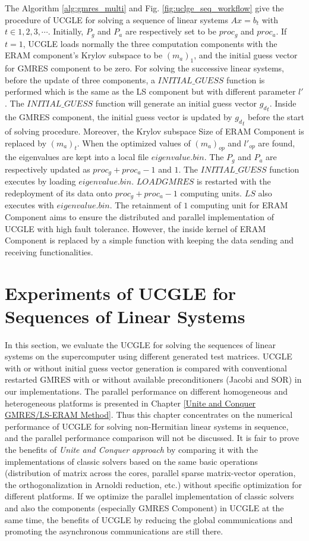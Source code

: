 The Algorithm \ref{alg:gmres_multi} and Fig. \ref{fig:uclge_seq_workflow} give the procedure of UCGLE for solving  a sequence of linear systems $Ax= b_t$ with $t \in 1,2,3, \cdots$. Initially, $P_g$ and $P_a$ are respectively set to be $proc_g$ and $proc_a$.  If $t=1$, UCGLE loads normally the three computation components with the ERAM component's Krylov subspace to be $(m_a)_1$, and the initial guess vector for GMRES component to be zero. For solving the successive linear systems, before the update of three components, a $INITIAL\_GUESS$ function is performed which is the same as the LS component but with different parameter $l'$. The $INITIAL\_GUESS$ function will generate an initial guess vector ${g_d}_t$. Inside the GMRES component, the initial guess vector is updated by ${g_d}_t$ before the start of solving procedure. Moreover, the Krylov subspace Size of ERAM Component is replaced by $(m_a)_t$. When the optimized values of $(m_a)_{op}$ and $l'_{op}$ are found, the eigenvalues are kept into a local file $eigenvalue.bin$. The $P_g$ and $P_a$ are respectively updated as  $proc_g+proc_a-1$ and $1$. The $INITIAL\_GUESS$ function executes by loading $eigenvalue.bin$. $LOADGMRES$ is restarted with the redeployment of its data onto $proc_g+proc_a-1$ computing units. $LS$ also executes with $eigenvalue.bin$. The retainment of $1$ computing unit for ERAM Component aims to ensure the distributed and parallel implementation of UCGLE with high fault tolerance. However, the inside kernel of ERAM Component is replaced by a simple function with keeping the data sending and receiving functionalities.

\section{Experiments of UCGLE for Sequences of Linear Systems}

In this section, we evaluate the UCGLE for solving the sequences of linear systems on the supercomputer using different generated test matrices. UCGLE with or without initial guess vector generation is compared with conventional restarted GMRES with or without available preconditioners (Jacobi and SOR) in our implementations. The parallel performance on different homogeneous and heterogeneous platforms is presented in Chapter \ref{Unite and Conquer GMRES/LS-ERAM Method}. Thus this chapter concentrates on the numerical performance of UCGLE for solving non-Hermitian linear systems in sequence, and the parallel performance comparison will not be discussed. It is fair to prove the benefits of \textit{Unite and Conquer approach} by comparing it with the implementations of classic solvers based on the same basic operations (distribution of matrix across the cores, parallel sparse matrix-vector operation, the orthogonalization in Arnoldi reduction, etc.) without specific optimization for different platforms. If we optimize the parallel implementation of classic solvers and also the components (especially GMRES Component) in UCGLE at the same time, the benefits of UCGLE by reducing the global communications and promoting the asynchronous communications are still there.  


